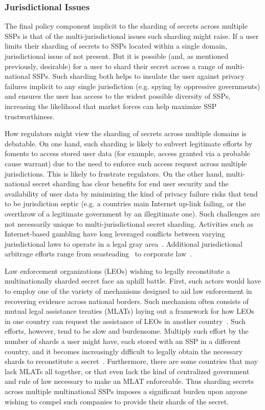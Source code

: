 \subsubsection{Jurisdictional Issues}
\label{chap:policy:trust:jurisdiction}

The final policy component implicit to the sharding of secrets across
multiple SSPs is that of the multi-jurisdictional issues such sharding
might raise. If a user limits their sharding of secrets to SSPs
located within a single domain, jurisdictional issue of not
present. But it is possible (and, as mentioned previously, desirable)
for a user to shard their secret across a range of multi-national
SSPs. Such sharding both helps to insulate the user against privacy
failures implicit to any single jurisdiction (e.g. spying by
oppressive governments) and ensures the user has access to the widest
possible diversity of SSPs, increasing the likelihood that market
forces can help maximize SSP trustworthiness.

How regulators might view the sharding of secrets across multiple
domains is debatable. On one hand, such sharding is likely to subvert
legitimate efforts by foments to access stored user data (for example,
access granted via a probable cause warrant) due to the need to
enforce such access request across multiple jurisdictions. This is
likely to frustrate regulators. On the other hand, multi-national
secret sharding has clear benefits for end user security and the
availability of user data by minimizing the kind of privacy failure
risks that tend to be jurisdiction septic (e.g. a countries main
Internet up-link failing, or the overthrow of a legitimate government
by an illegitimate one). Such challenges are not necessarily unique to
multi-jurisdictional secret sharding. Activities such as
Internet-based gambling have long leveraged conflicts between varying
jurisdictional laws to operate in a legal gray
area~\cite{miller2006}. Additional jurisdictional arbitrage efforts
range from seasteading~\cite{balloun2012} to corporate
law~\cite{kocaoglu2008}.

Law enforcement organizations (LEOs) wishing to legally reconstitute a
multinationally sharded secret face an uphill battle. First, such
actors would have to employ one of the variety of mechanisms designed
to aid law enforcement in recovering evidence across national
borders. Such mechanism often consists of mutual legal assistance
treaties (MLATs) laying out a framework for how LEOs in one country
can request the assistance of LEOs in another
country~\cite{stigall2013, walden2011}. Such efforts, however, tend to
be slow and burdensome. Multiply such effort by the number of shards a
user might have, each stored with an SSP in a different country, and
it becomes increasingly difficult to legally obtain the necessary
shards to reconstitute a secret~\cite{kent2015}. Furthermore, there
are some countries that may lack MLATs all together, or that even lack
the kind of centralized government and rule of law necessary to make
an MLAT enforceable. Thus sharding secrets across multiple
multinational SSPs imposes a significant burden upon anyone wishing to
compel such companies to provide their shards of the secret.

